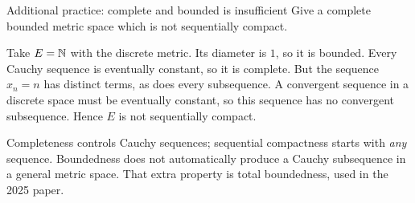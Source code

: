 \begin{exam}{Additional practice: complete and bounded is insufficient}
Give a complete bounded metric space which is not sequentially compact.
\end{exam}
\begin{answer}
Take $E=\mathbb N$ with the discrete metric. Its diameter is $1$, so it is bounded. Every Cauchy sequence is eventually constant, so it is complete. But the sequence $x_n=n$ has distinct terms, as does every subsequence. A convergent sequence in a discrete space must be eventually constant, so this sequence has no convergent subsequence. Hence $E$ is not sequentially compact.
\end{answer}
\begin{tip}
Completeness controls Cauchy sequences; sequential compactness starts with \emph{any} sequence. Boundedness does not automatically produce a Cauchy subsequence in a general metric space. That extra property is total boundedness, used in the 2025 paper.
\end{tip}


